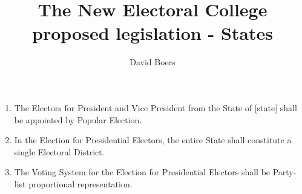 \documentclass{article}
\title{The New Electoral College proposed legislation - States}
\author{David Boers}
\begin{document}
    \subject{To ammend the method by which the State of [state] appoints Electors for President and Vice President.}
    \begin{enumerate}
        \item The Electors for President and Vice President from the State of [state] shall be appointed by Popular Election.
        \item In the Election for Presidential Electors, the entire State shall constitute a single Electoral District.
        \item The Voting System for the Election for Presidential Electors shall be Party-list proportional representation.
    \end{enumerate}
\end{document}
